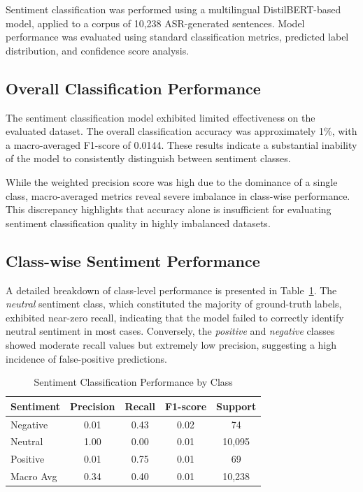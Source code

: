 Sentiment classification was performed using a multilingual DistilBERT-based model, applied to a corpus of 10,238 ASR-generated sentences. Model performance was evaluated using standard classification metrics, predicted label distribution, and confidence score analysis.

\subsection{Overall Classification Performance}

The sentiment classification model exhibited limited effectiveness on the evaluated dataset. The overall classification accuracy was approximately 1\%, with a macro-averaged F1-score of 0.0144. These results indicate a substantial inability of the model to consistently distinguish between sentiment classes.

While the weighted precision score was high due to the dominance of a single class, macro-averaged metrics reveal severe imbalance in class-wise performance. This discrepancy highlights that accuracy alone is insufficient for evaluating sentiment classification quality in highly imbalanced datasets.

\subsection{Class-wise Sentiment Performance}

A detailed breakdown of class-level performance is presented in Table~\ref{tab:sentiment_classification_report}. The \textit{neutral} sentiment class, which constituted the majority of ground-truth labels, exhibited near-zero recall, indicating that the model failed to correctly identify neutral sentiment in most cases. Conversely, the \textit{positive} and \textit{negative} classes showed moderate recall values but extremely low precision, suggesting a high incidence of false-positive predictions.

\begin{table}[h]
\centering
\caption{Sentiment Classification Performance by Class}
\label{tab:sentiment_classification_report}
\begin{tabular}{lcccc}
\hline
\textbf{Sentiment} & \textbf{Precision} & \textbf{Recall} & \textbf{F1-score} & \textbf{Support} \\
\hline
Negative & 0.01 & 0.43 & 0.02 & 74 \\
Neutral  & 1.00 & 0.00 & 0.01 & 10,095 \\
Positive & 0.01 & 0.75 & 0.01 & 69 \\
\hline
Macro Avg & 0.34 & 0.40 & 0.01 & 10,238 \\
\hline
\end{tabular}
\end{table}

